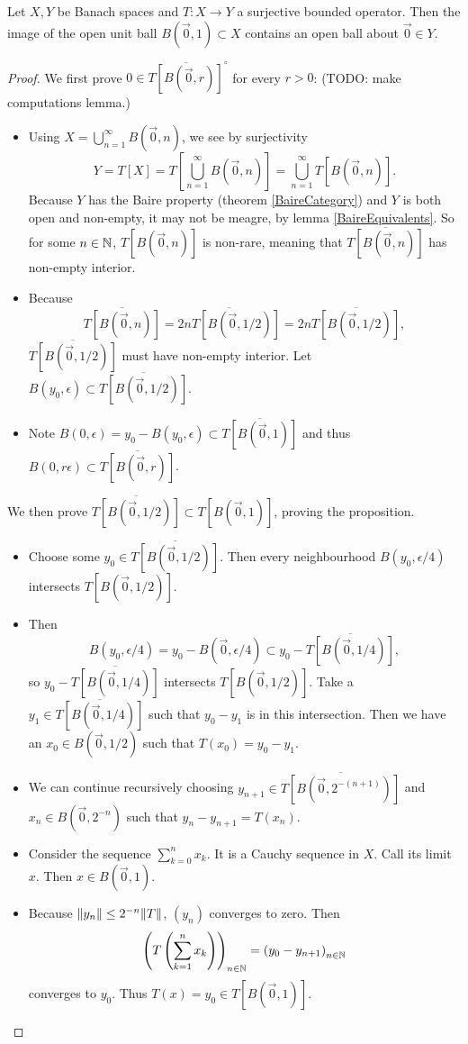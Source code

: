 \begin{proposition} \label{openUnitBall}
Let $X,Y$ be Banach spaces and $T:X\to Y$ a surjective bounded operator.  Then the image of the open unit ball $B(\vec{0},1)\subset X$ contains an open ball about $\vec{0}\in Y$.
\end{proposition}
\begin{proof}
We first prove $0\in \overline{T[B(\vec{0},r)]}^\circ$ for every $r>0$: (TODO: make computations lemma.)
\begin{itemize}
\item Using $X = \bigcup_{n=1}^\infty B(\vec{0},n)$, we see by surjectivity
\[ Y = T[X] = T\left[\bigcup_{n=1}^\infty B(\vec{0},n)\right] = \bigcup_{n=1}^\infty T[B(\vec{0},n)]. \]
Because $Y$ has the Baire property (theorem \ref{BaireCategory}) and $Y$ is both open and non-empty, it may not be meagre, by lemma \ref{BaireEquivalents}. So for some $n\in\mathbb{N}$, $T[B(\vec{0},n)]$ is non-rare, meaning that $\overline{T[B(\vec{0},n)]}$ has non-empty interior.
\item Because
\[ \overline{T[B(\vec{0},n)]} = \overline{2nT[B(\vec{0},1/2)]} = 2n\overline{T[B(\vec{0},1/2)]}, \]
$\overline{T[B(\vec{0},1/2)]}$ must have non-empty interior. Let $B(y_0,\epsilon)\subset \overline{T[B(\vec{0},1/2)]}$.
\item Note $B(0,\epsilon) = y_0 - B(y_0,\epsilon) \subset \overline{T[B(\vec{0},1)]}$ and thus $B(0,r\epsilon) \subset \overline{T[B(\vec{0},r)]}$.
\end{itemize}
We then prove $\overline{T[B(\vec{0},1/2)]} \subset T[B(\vec{0}, 1)]$, proving the proposition.
\begin{itemize}
\item Choose some $y_0\in \overline{T[B(\vec{0},1/2)]}$. Then every neighbourhood $B(y_0,\epsilon/4)$ intersects $T[B(\vec{0},1/2)]$.
\item Then
\[ B(y_0,\epsilon/4) = y_0 - B(\vec{0},\epsilon/4) \subset y_0 - \overline{T[B(\vec{0},1/4)]}, \]
so $y_0 - \overline{T[B(\vec{0},1/4)]}$ intersects $T[B(\vec{0},1/2)]$. Take a $y_1 \in \overline{T[B(\vec{0},1/4)]}$ such that $y_0-y_1$ is in this intersection. Then we have an $x_0\in B(\vec{0},1/2)$ such that $T(x_0) = y_0-y_1$.
\item We can continue recursively choosing $y_{n+1}\in \overline{T[B(\vec{0}, 2^{-(n+1)})]}$ and $x_n \in B(\vec{0}, 2^{-n})$ such that $y_n-y_{n+1} = T(x_n)$.
\item Consider the sequence $\sum_{k=0}^nx_k$. It is a Cauchy sequence in $X$. Call its limit $x$. Then $x\in B(\vec{0},1)$.
\item Because $\lVert y_n\rVert\leq 2^{-n}\lVert T\rVert$, $(y_n)$ converges to zero. Then
\[ \left( T\left(\sum^n_{k=1}x_k\right) \right)_{n\in\mathbb{N}} = \left( y_0-y_{n+1} \right)_{n\in\mathbb{N}} \]
converges to $y_0$. Thus $T(x) = y_0 \in T[B(\vec{0},1)]$.
\end{itemize}
\end{proof}


